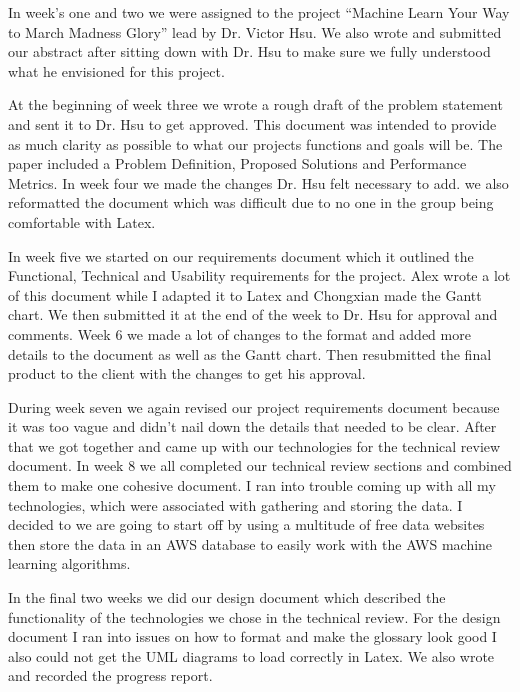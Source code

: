 \documentclass[letterpaper, 10pt,titlepage]{article}
\begin{document}
In week’s one and two we were assigned to the project “Machine Learn Your Way to March Madness Glory” lead by Dr. Victor Hsu. We also wrote and submitted our abstract after sitting down with Dr. Hsu to make sure we fully understood what he envisioned for this project.
\par
At the beginning of week three we wrote a rough draft of the problem statement and sent it to Dr. Hsu to get approved. This document was intended to provide as much clarity as possible to what our projects functions and goals will be. The paper included a Problem Definition, Proposed Solutions and Performance Metrics. In week four we made the changes Dr. Hsu felt necessary to add. we also reformatted the document which was difficult due to no one in the group being comfortable with Latex.
\par
In week five we started on our requirements document which it outlined the Functional, Technical and Usability requirements for the project. Alex wrote a lot of this document while I adapted it to Latex and Chongxian made the Gantt chart. We then submitted it at the end of the week to Dr. Hsu for approval and comments. Week 6 we made a lot of changes to the format and added more details to the document as well as the Gantt chart. Then resubmitted the final product to the client with the changes to get his approval.
\par
During week seven we again revised our project requirements document because it was too vague and didn’t nail down the details that needed to be clear. After that we got together and came up with our technologies for the technical review document. In week 8 we all completed our technical review sections and combined them to make one cohesive document. I ran into trouble coming up with all my technologies, which were associated with gathering and storing the data. I decided to we are going to start off by using a multitude of free data websites then store the data in an AWS database to easily work with the AWS machine learning algorithms.
\par
In the final two weeks we did our design document which described the functionality of the technologies we chose in the technical review. For the design document I ran into issues on how to format and make the glossary look good I also could not get the UML diagrams to load correctly in Latex. We also wrote and recorded the progress report.
\par
\end{document}
